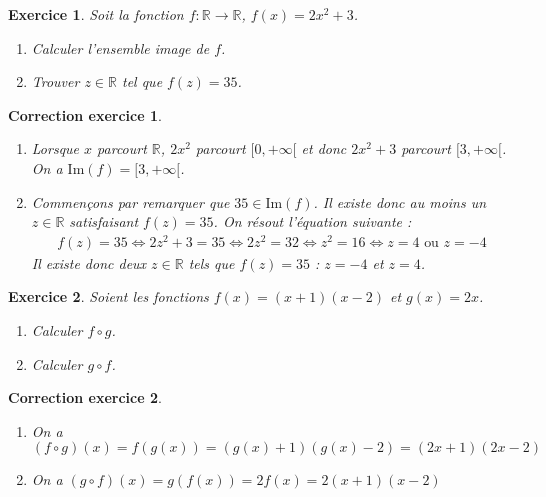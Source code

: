\documentclass[12pt]{article}
\newtheorem{exercice}{\bf Exercice}
\newtheorem{correction}{\bf Correction exercice}
\newenvironment{exo}{
  \begin{exercice}\normalfont}{\end{exercice}
}
\newenvironment{cor}{
\begin{correction}\smallskip\normalfont}{\end{correction}
}
\newcommand*{\R}{\mathbb{R}}
\newif\ifcorrige\corrigetrue
\begin{document}

\begin{exo} Soit la fonction $f : \R \to \R$, $f(x) = 2x^2+3$.
\begin{multicols}{2}
\begin{enumerate}
\item Calculer l'ensemble image de $f$.
\item Trouver $z\in\R$ tel que $f(z) = 35$.
\end{enumerate}
\end{multicols}
\end{exo}

\ifcorrige
\color{magenta}
\begin{cor}
  $\qquad$
\begin{enumerate}
\item Lorsque $x$ parcourt $\R$, $2x^2$ parcourt $[0,+\infty[$ et donc $2x^2+3$ parcourt $[3,+\infty[$.
  On a $\text{Im}(f) = [3,+\infty[$.
\item Commen\c{c}ons par remarquer que $35 \in \text{Im}(f)$.
  Il existe donc au moins un $z \in \R$ satisfaisant $f(z) = 35$.
  On r\'esout l'\'equation suivante :
  \begin{align*}
    f(z) = 35
    \iff
    2z^2+3 = 35
    \iff
    2z^2 = 32
    \iff
    z^2 = 16
    \iff
    z = 4 \text{  ou  } z = -4
  \end{align*}
  Il existe donc deux $z \in \R$ tels que $f(z) = 35$ :
  $z=-4$ et $z=4$.
\end{enumerate}
\end{cor}
\color{black}
\fi


\begin{exo} Soient les fonctions $f(x) = (x+1)(x-2)$
  et $g(x) = 2x$.
\begin{multicols}{2}
\begin{enumerate}
\item Calculer $f \circ g$.
\item Calculer $g \circ f$.
\end{enumerate}
\end{multicols}
\end{exo}

\ifcorrige
\color{magenta}
\begin{cor}
  $\qquad$
\begin{enumerate}
\item On a
    $(f \circ g) (x) = f(g(x)) = (g(x)+1)(g(x)-2) = (2x+1)(2x-2)$
\item On a
    $(g \circ f) (x) = g(f(x)) = 2 f(x) = 2(x+1)(x-2)$
\end{enumerate}
\end{cor}
\color{black}
\fi
\end{document}
